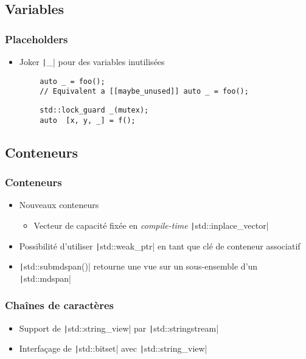 \documentclass[C++.tex]{subfiles}
\begin{document}
\subsection*{Variables}
\begin{frame}[fragile]
	\frametitle{Placeholders}
	\begin{itemize}
		\item Joker \texttt|_| pour des variables inutilisées
	\end{itemize}
	
	\begin{verbatim}
		auto _ = foo();
		// Equivalent a [[maybe_unused]] auto _ = foo();
	\end{verbatim}

	\begin{verbatim}
		std::lock_guard _(mutex);
		auto  [x, y, _] = f();
	\end{verbatim}
\end{frame}

\subsection*{Conteneurs}
\begin{frame}[fragile]
	\frametitle{Conteneurs}
	\begin{itemize}
		\item Nouveaux conteneurs
		\begin{itemize}
			\item Vecteur de capacité fixée en \textit{compile-time} \texttt|std::inplace_vector|

		\end{itemize}
		\item Possibilité d'utiliser \texttt|std::weak_ptr| en tant que clé de conteneur associatif
		\item \texttt|std::submdspan()| retourne une vue sur un sous-ensemble d'un \texttt|std::mdspan|
	\end{itemize}
\end{frame}

\begin{frame}[fragile]
	\frametitle{Chaînes de caractères}
	\begin{itemize}
		\item Support de \texttt|std::string_view| par \texttt|std::stringstream|
		\item Interfaçage de \texttt|std::bitset| avec \texttt|std::string_view|
	\end{itemize}
\end{frame}
\end{document}
